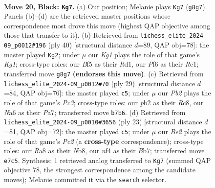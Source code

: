 \documentclass[11pt]{article}
\begin{document}
\begin{figure}[p]
\label{fig:thought-m37}
\end{figure}

\clearpage

\begin{figure}[p]\centering
\begin{subfigure}{0.46\textwidth}\centering
\resizebox{\linewidth}{!}{%
\newchessgame
\chessboard[
  setfen={r2q1rk1/ppp1b3/n4pp1/5b1p/P1pP1N2/2N5/RPP1RPPP/2BQ2K1 b - - 3 20},
  showmover=false,
  pgfstyle=straightmove, color=movearrow, markmove={g8-g7}
]}
\caption{}
\end{subfigure}\hfill
\begin{subfigure}{0.46\textwidth}\centering
\resizebox{\linewidth}{!}{%
\newchessgame
\chessboard[
  setfen={r3r1k1/p1q2pp1/1ppb1np1/4n3/Q1P5/2N1B1PP/PP2BP2/3RR1K1 w - - 4 21},
  showmover=false,
  pgfstyle=straightmove, color=movearrow, markmove={g1-g2}
]}
\caption{}
\end{subfigure}
\\[4pt]
\begin{subfigure}{0.46\textwidth}\centering
\resizebox{\linewidth}{!}{%
\newchessgame
\chessboard[
  setfen={2rq1rk1/pp2bpp1/2p1bn1p/8/3P4/P1PQ1N2/2BB1PPP/R3R1K1 b - - 0 15},
  showmover=false,
  pgfstyle=straightmove, color=movearrow, markmove={c6-c5}
]}
\caption{}
\end{subfigure}\hfill
\begin{subfigure}{0.46\textwidth}\centering
\resizebox{\linewidth}{!}{%
\newchessgame
\chessboard[
  setfen={rn1q1rk1/1bp1bp1p/p3p3/1p3p2/3P4/2N2NP1/PPP2PBP/R2QR1K1 b - - 5 12},
  showmover=false,
  pgfstyle=straightmove, color=movearrow, markmove={c7-c5}
]}
\caption{}
\end{subfigure}
\caption{\textbf{Move 20, Black: \texttt{Kg7}.} (a) Our position; Melanie plays \texttt{Kg7} (\texttt{g8g7}). Panels (b)--(d) are the retrieved master positions whose correspondence most drove this move (highest QAP objective among those that transfer to it). (b) Retrieved from \texttt{lichess\_elite\_2024-09\_p0012\#196} (ply 40) [structural distance $d$=89, QAP obj=78]: the master played \texttt{Kg2}; under $\mu$ our \emph{Kg1} plays the role of that game's \emph{Kg1}; cross-type roles: our \emph{B}f5 as their \emph{R}d1, our \emph{P}f6 as their \emph{R}e1; transferred move \texttt{g8g7} \textbf{(endorses this move)}. (c) Retrieved from \texttt{lichess\_elite\_2024-09\_p0012\#70} (ply 29) [structural distance $d$=84, QAP obj=76]: the master played \texttt{c5}; under $\mu$ our \emph{Pb2} plays the role of that game's \emph{Pc3}; cross-type roles: our \emph{p}b2 as their \emph{R}c8, our \emph{N}a6 as their \emph{P}a7; transferred move \texttt{b7b6}. (d) Retrieved from \texttt{lichess\_elite\_2024-09\_p0010\#3656} (ply 23) [structural distance $d$=81, QAP obj=72]: the master played \texttt{c5}; under $\mu$ our \emph{Be2} plays the role of that game's \emph{Pc2} (a \textbf{cross-type} correspondence); cross-type roles: our \emph{R}a8 as their \emph{N}b8, our \emph{n}f4 as their \emph{B}b7; transferred move \texttt{e7c5}. Synthesis: 1 retrieved analog transferred to \texttt{Kg7} (summed QAP objective 78, the strongest correspondence among the candidate moves); Melanie committed it via the \texttt{search} selector.}

\end{figure}
\end{document}
